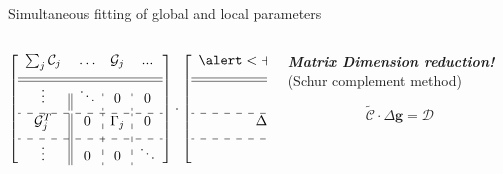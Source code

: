 \documentclass[compress, 13pt, aspectratio=169]{beamer}
\begin{document}
\begin{frame}[t,fragile]{Simultaneous fitting of global and local parameters}
\begin{columns}[t]
\begin{column}{0.45\textwidth}
			\vspace*{-0.9em}
			\setlength\extrarowheight{6pt}
			\scriptsize{
				$$ \left[  \begin{array}{c||c:c:c}
							\sum_j \mathcal{C}_j & \ldots & \mathcal{G}_j & ...    \\[6pt] \hline\hline
							\vdots               & \ddots & 0             & 0      \\[4pt] \hdashline
							\mathcal{G}^T_j      & 0      & \Gamma_j      & 0      \\[6pt] \hdashline
							\vdots               & 0      & 0             & \ddots \\
						\end{array}  \right] \cdot
					\left[ \begin{array}{c}
							\alert<+(1)->{\Delta \mathbf{g}} \\[6pt] \hline\hline
							\vdots                           \\[4pt] \hdashline
							\Delta \mathbf{p}^j              \\[6pt] \hdashline
							\vdots                           \\
						\end{array} \right] =
					-\left[ \begin{array}{c}
							\partial_\mathbf{g} \mathcal{Z}     \\[6pt] \hline\hline
							\vdots                              \\[4pt] \hdashline
							\partial_{\mathbf{p}^j} \mathcal{Z} \\[6pt] \hdashline
							\vdots                              \\
						\end{array} \right]
				$$
			}
		\end{column}
		\begin{column}[t]{0.45\textwidth}
			\vspace*{-1.5em}

			\pause
			{
				\small
				\textbf{\textit{Matrix Dimension reduction!}} (Schur complement method)
				\vspace*{-0.5em}

				$$\tilde{\mathcal{C}} \cdot \Delta \mathbf{g} = \mathcal{D}$$
				\vspace*{-1.5em}

}
\end{column}
\end{columns}
\end{frame}
\end{document}
